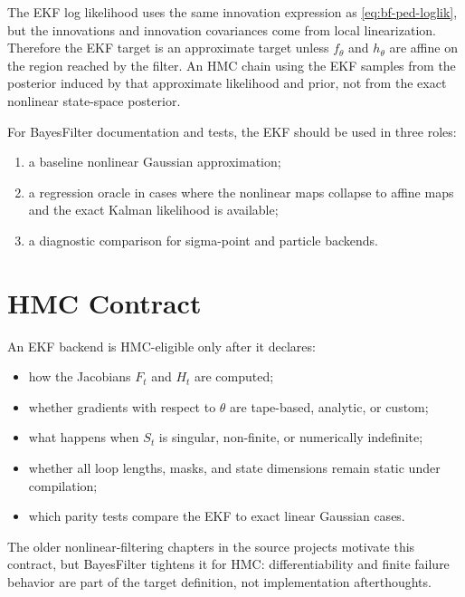 The EKF log likelihood uses the same innovation expression as
\eqref{eq:bf-ped-loglik}, but the innovations and innovation covariances come
from local linearization.  Therefore the EKF target is an approximate target
unless $f_\theta$ and $h_\theta$ are affine on the region reached by the
filter.  An HMC chain using the EKF samples from the posterior induced by that
approximate likelihood and prior, not from the exact nonlinear state-space
posterior.

For BayesFilter documentation and tests, the EKF should be used in three roles:
\begin{enumerate}[label=(\roman*)]
  \item a baseline nonlinear Gaussian approximation;
  \item a regression oracle in cases where the nonlinear maps collapse to
    affine maps and the exact Kalman likelihood is available;
  \item a diagnostic comparison for sigma-point and particle backends.
\end{enumerate}

\section{HMC Contract}
\label{sec:bf-ekf-hmc-contract}

An EKF backend is HMC-eligible only after it declares:
\begin{itemize}
  \item how the Jacobians $F_t$ and $H_t$ are computed;
  \item whether gradients with respect to $\theta$ are tape-based, analytic, or
    custom;
  \item what happens when $S_t$ is singular, non-finite, or numerically
    indefinite;
  \item whether all loop lengths, masks, and state dimensions remain static
    under compilation;
  \item which parity tests compare the EKF to exact linear Gaussian cases.
\end{itemize}
The older nonlinear-filtering chapters in the source projects motivate this
contract, but BayesFilter tightens it for HMC: differentiability and finite
failure behavior are part of the target definition, not implementation
afterthoughts.
